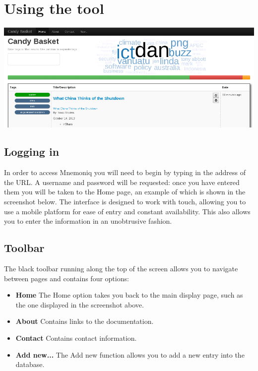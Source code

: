 \documentclass[letterpaper,10pt,english]{sphinxmanual}
\begin{document}
\section{Using the tool}
\label{user-guide:using-the-tool}
{\hfill\includegraphics{candy-basket.png}\hfill}


\subsection{Logging in}
\label{user-guide:logging-in}
In order to access Mnemoniq you will need to begin by typing in the
address of the URL. A username and password will be requested: once
you have entered them you will be taken to the Home page, an example
of which is shown in the screenshot below. The interface is designed
to work with touch, allowing you to use a mobile platform for ease of
entry and constant availability. This also allows you to enter the
information in an unobtrusive fashion.


\subsection{Toolbar}
\label{user-guide:toolbar}
The black toolbar running along the top of the screen allows you to
navigate between pages and contains four options:
\begin{itemize}
\item {} 
\textbf{Home} The Home option takes you back to the main display page, such as the one displayed in the screenshot above.

\item {} 
\textbf{About} Contains links to the documentation.

\item {} 
\textbf{Contact} Contains contact information.

\item {} 
\textbf{Add new...} The Add new function allows you to add a new entry into the database.

\end{itemize}
\end{document}
